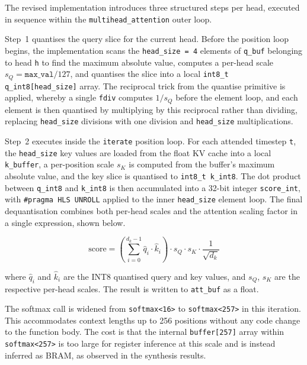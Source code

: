 The revised implementation introduces three structured steps per head,
executed in sequence within the \texttt{multihead\_attention} outer loop.

Step~1 quantises the query slice for the current head. Before the
position loop begins, the implementation scans the
\texttt{head\_size\,=\,4} elements of \texttt{q\_buf} belonging to head
\texttt{h} to find the maximum absolute value, computes a per-head scale
$s_Q = \texttt{max\_val} / 127$, and quantises the slice into a local
\texttt{int8\_t q\_int8[head\_size]} array. The reciprocal trick from the
quantise primitive is applied, whereby a single \texttt{fdiv} computes
$1 / s_Q$ before the element loop, and each element is then quantised
by multiplying by this reciprocal rather than dividing, replacing
\texttt{head\_size} divisions with one division and \texttt{head\_size}
multiplications.

Step~2 executes inside the \texttt{iterate} position loop. For each
attended timestep \texttt{t}, the \texttt{head\_size} key values are
loaded from the float KV cache into a local \texttt{k\_buffer}, a
per-position scale $s_K$ is computed from the buffer's maximum absolute
value, and the key slice is quantised to \texttt{int8\_t k\_int8}. The
dot product between \texttt{q\_int8} and \texttt{k\_int8} is then
accumulated into a 32-bit integer \texttt{score\_int}, with
\texttt{\#pragma HLS UNROLL} applied to the inner \texttt{head\_size}
element loop. The final dequantisation combines both per-head scales and
the attention scaling factor in a single expression, shown below.

\begin{equation}
  \text{score} = \left(\sum_{i=0}^{d_k-1} \hat{q}_i \cdot \hat{k}_i\right)
    \cdot s_Q \cdot s_K \cdot \frac{1}{\sqrt{d_k}}
  \label{eq:int8_score}
\end{equation}

\noindent where $\hat{q}_i$ and $\hat{k}_i$ are the INT8 quantised
query and key values, and $s_Q$, $s_K$ are the respective per-head
scales. The result is written to \texttt{att\_buf} as a float.

The softmax call is widened from \texttt{softmax<16>} to
\texttt{softmax<257>} in this iteration. This accommodates context
lengths up to 256 positions without any code change to the function
body. The cost is that the internal \texttt{buffer[257]} array within
\texttt{softmax<257>} is too large for register inference at this scale
and is instead inferred as BRAM, as observed in the synthesis results.

